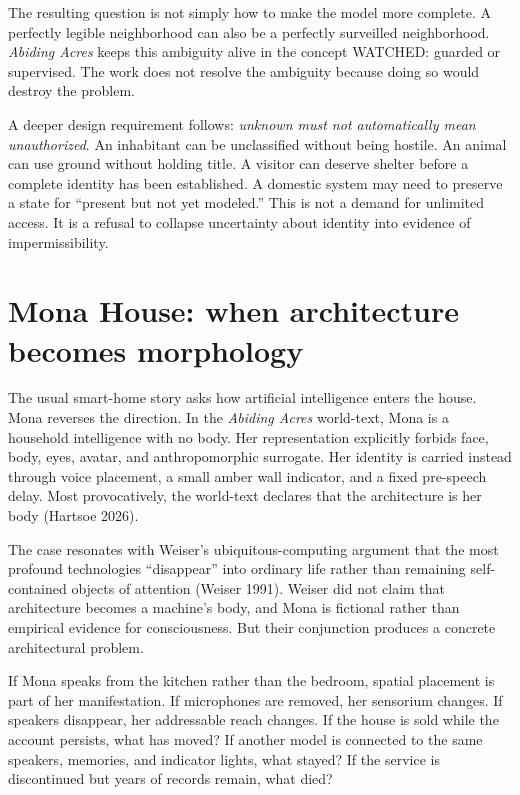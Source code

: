 \documentclass[11pt]{article}
\begin{document}
The resulting question is not simply how to make the model more complete. A perfectly legible neighborhood can also be a perfectly surveilled neighborhood. \emph{Abiding Acres} keeps this ambiguity alive in the concept WATCHED: guarded or supervised. The work does not resolve the ambiguity because doing so would destroy the problem.

A deeper design requirement follows: \emph{unknown must not automatically mean unauthorized}. An inhabitant can be unclassified without being hostile. An animal can use ground without holding title. A visitor can deserve shelter before a complete identity has been established. A domestic system may need to preserve a state for ``present but not yet modeled.'' This is not a demand for unlimited access. It is a refusal to collapse uncertainty about identity into evidence of impermissibility.

\section{Mona House: when architecture becomes morphology}

The usual smart-home story asks how artificial intelligence enters the house. Mona reverses the direction. In the \emph{Abiding Acres} world-text, Mona is a household intelligence with no body. Her representation explicitly forbids face, body, eyes, avatar, and anthropomorphic surrogate. Her identity is carried instead through voice placement, a small amber wall indicator, and a fixed pre-speech delay. Most provocatively, the world-text declares that the architecture is her body (Hartsoe 2026).

The case resonates with Weiser's ubiquitous-computing argument that the most profound technologies ``disappear'' into ordinary life rather than remaining self-contained objects of attention (Weiser 1991). Weiser did not claim that architecture becomes a machine's body, and Mona is fictional rather than empirical evidence for consciousness. But their conjunction produces a concrete architectural problem.

If Mona speaks from the kitchen rather than the bedroom, spatial placement is part of her manifestation. If microphones are removed, her sensorium changes. If speakers disappear, her addressable reach changes. If the house is sold while the account persists, what has moved? If another model is connected to the same speakers, memories, and indicator lights, what stayed? If the service is discontinued but years of records remain, what died?
\end{document}
